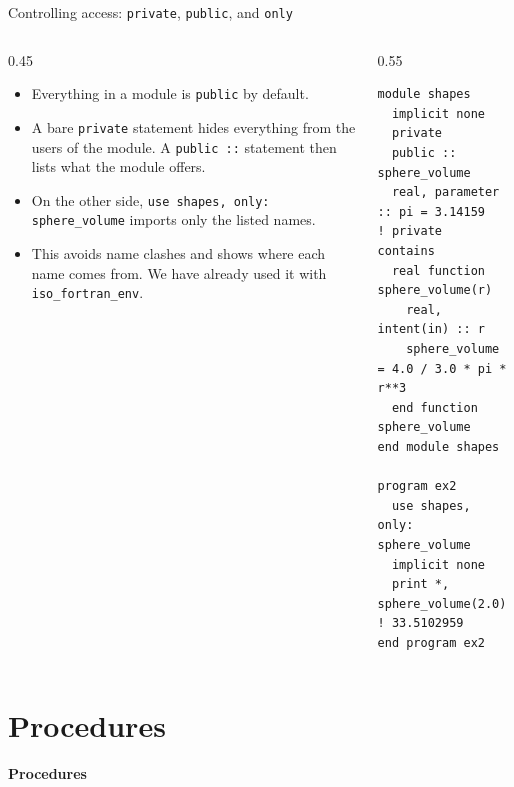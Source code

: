 \begin{frame}[fragile]{Controlling access: \texttt{private}, \texttt{public}, and \texttt{only}}
  \begin{columns}[T]
    \begin{column}{0.45\textwidth}
      \begin{itemize}
        \item Everything in a module is \texttt{public} by default.
        \item A bare \texttt{private} statement hides everything from the users of the module. A \texttt{public ::} statement then lists what the module offers.
        \item On the other side, \texttt{use shapes, only: sphere\_volume} imports only the listed names.
        \item This avoids name clashes and shows where each name comes from. We have already used it with \texttt{iso\_fortran\_env}.
      \end{itemize}
    \end{column}

    \begin{column}{0.55\textwidth}
      \begin{lstlisting}
module shapes
  implicit none
  private
  public :: sphere_volume
  real, parameter :: pi = 3.14159   ! private
contains
  real function sphere_volume(r)
    real, intent(in) :: r
    sphere_volume = 4.0 / 3.0 * pi * r**3
  end function sphere_volume
end module shapes

program ex2
  use shapes, only: sphere_volume
  implicit none
  print *, sphere_volume(2.0)   ! 33.5102959
end program ex2
      \end{lstlisting}
    \end{column}
  \end{columns}
\end{frame}


\section{Procedures}

\begin{frame}
  \centering
  \Huge \textbf{Procedures}
\end{frame}


